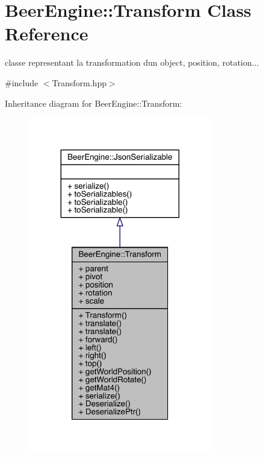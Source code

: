 \hypertarget{class_beer_engine_1_1_transform}{}\section{Beer\+Engine\+:\+:Transform Class Reference}
\label{class_beer_engine_1_1_transform}


classe representant la transformation d\textquotesingle{}un object, position, rotation...  




{\ttfamily \#include $<$Transform.\+hpp$>$}



Inheritance diagram for Beer\+Engine\+:\+:Transform\+:\nopagebreak
\begin{figure}[H]
\begin{center}
\leavevmode
\includegraphics[width=227pt]{class_beer_engine_1_1_transform__inherit__graph}
\end{center}
\end{figure}


